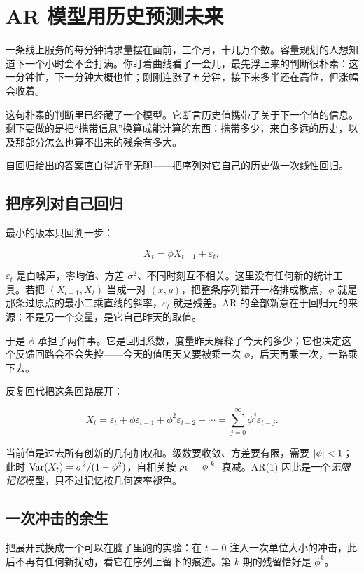 \section{AR 模型用历史预测未来}
\label{sec:06-Random-Processes/06-ARMA-and-ARIMA/01}

一条线上服务的每分钟请求量摆在面前，三个月，十几万个数。容量规划的人想知道下一个小时会不会打满。你盯着曲线看了一会儿，最先浮上来的判断很朴素：这一分钟忙，下一分钟大概也忙；刚刚连涨了五分钟，接下来多半还在高位，但涨幅会收着。

这句朴素的判断里已经藏了一个模型。它断言历史值携带了关于下一个值的信息。剩下要做的是把``携带信息''换算成能计算的东西：携带多少，来自多远的历史，以及那部分怎么也算不出来的残余有多大。

自回归给出的答案直白得近乎无聊——把序列对它自己的历史做一次线性回归。

\subsection{把序列对自己回归}

最小的版本只回溯一步：

\[
X_t=\phi X_{t-1}+\varepsilon_t,
\]

\(\varepsilon_t\) 是白噪声，零均值、方差 \(\sigma^2\)、不同时刻互不相关。这里没有任何新的统计工具。若把 \((X_{t-1},X_t)\) 当成一对 \((x,y)\)，把整条序列错开一格排成散点，\(\phi\) 就是那条过原点的最小二乘直线的斜率，\(\varepsilon_t\) 就是残差。AR 的全部新意在于回归元的来源：不是另一个变量，是它自己昨天的取值。

于是 \(\phi\) 承担了两件事。它是回归系数，度量昨天解释了今天的多少；它也决定这个反馈回路会不会失控——今天的值明天又要被乘一次 \(\phi\)，后天再乘一次，一路乘下去。

反复回代把这条回路展开：

\[
X_t=\varepsilon_t+\phi\varepsilon_{t-1}+\phi^2\varepsilon_{t-2}+\cdots
=\sum_{j=0}^{\infty}\phi^j\varepsilon_{t-j}.
\]

当前值是过去所有创新的几何加权和。级数要收敛、方差要有限，需要 \(\left|\phi\right|<1\)；此时 \(\operatorname{Var}(X_t)=\sigma^2/(1-\phi^2)\)，自相关按 \(\rho_k=\phi^{\left|k\right|}\) 衰减。AR(1) 因此是一个\emph{无限记忆}模型，只不过记忆按几何速率褪色。

\subsection{一次冲击的余生}

把展开式换成一个可以在脑子里跑的实验：在 \(t=0\) 注入一次单位大小的冲击，此后不再有任何新扰动，看它在序列上留下的痕迹。第 \(k\) 期的残留恰好是 \(\phi^k\)。

